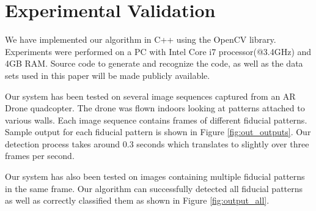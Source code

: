 \documentclass[10pt,twocolumn,letterpaper]{article}
\begin{document}

\section{Experimental Validation}

We have implemented our algorithm in C++ using the OpenCV library.
Experiments were performed on a PC with Intel Core i7 processor(@3.4GHz) and 4GB RAM.
Source code to generate and recognize the code, as well as the data sets used in
this paper will be made publicly available.

Our system has been tested on several image sequences captured from an AR Drone
quadcopter.  The drone was flown indoors looking at patterns attached to
various walls. Each image sequence contains frames of different fiducial
patterns. Sample output for each fiducial pattern is shown in Figure
\ref{fig:out_outputs}. Our detection process takes around 0.3 seconds which
translates to slightly over three frames per second.

Our system has also been tested on images containing multiple fiducial patterns
in the same frame. Our algorithm can successfully detected all fiducial patterns as
well as correctly classified them as shown in Figure \ref{fig:output_all}.
\end{document}
